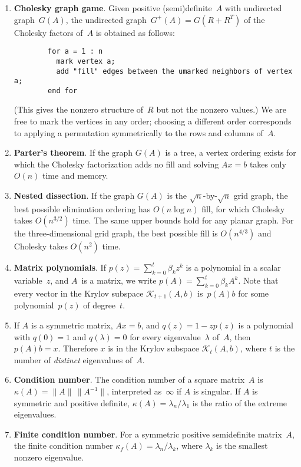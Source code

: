 \documentclass[11pt]{article}
\newcommand{\krylov}{\mathcal{K}}       %
\begin{document}
\begin{enumerate}
\item{\bf Cholesky graph game}.
Given positive (semi)definite~$A$ with undirected graph~$G(A)$,
the undirected graph~$G^+(A)=G(R+R^T)$ of the Cholesky factors
of~$A$ is obtained as follows:
\begin{verbatim}
        for a = 1 : n
          mark vertex a;
          add "fill" edges between the umarked neighbors of vertex a;
        end for
\end{verbatim}
(This gives the nonzero structure of~$R$ but not the nonzero values.)
We are free to mark the vertices in any order;
choosing a different order corresponds to applying a
permutation symmetrically to the rows and columns of~$A$.

\item{\bf Parter's theorem}.
If the graph $G(A)$ is a tree, a vertex ordering exists for
which the Cholesky factorization adds no fill and solving
$Ax=b$ takes only $O(n)$ time and memory.

\item{\bf Nested dissection}.
If the graph $G(A)$ is the $\sqrt{n}$-by-$\sqrt{n}$ grid graph,
the best possible elimination ordering has $O(n\log n)$ fill,
for which Cholesky takes $O(n^{3/2})$ time.
The same upper bounds hold for any planar graph.
For the three-dimensional grid graph, the best possible
fill is $O(n^{4/3})$ and Cholesky takes $O(n^2)$ time.

\item{\bf Matrix polynomials}.
If $p(z) = \sum_{k=0}^t \beta_kz^k$ is a polynomial in a 
scalar variable~$z$, and $A$~is a matrix,
we write $p(A) = \sum_{k=0}^t \beta_kA^k$.
Note that every vector in the Krylov subspace $\krylov_{t+1}(A,b)$
is~$p(A)b$ for some polynomial~$p(z)$ of degree~$t$.

\item
If $A$ is a symmetric matrix, $Ax=b$, 
and $q(z) = 1 - zp(z)$ is a polynomial with
$q(0)=1$ and $q(\lambda)=0$ for every eigenvalue~$\lambda$ of~$A$,
then $p(A)b = x$.
Therefore $x$ is in the Krylov subspace $\krylov_{t}(A,b)$, 
where $t$ is the number of {\em distinct} eigenvalues of~$A$.

\item{\bf Condition number}.
The condition number of a square matrix~$A$ is 
$\kappa(A)=\|A\|\,\|A^{-1}\|$, interpreted as~$\infty$
if $A$ is singular.  If $A$ is symmetric and positive 
definite, $\kappa(A) = \lambda_n/\lambda_1$ is the ratio
of the extreme eigenvalues.

\item{\bf Finite condition number}.
For a symmetric positive semidefinite matrix~$A$,
the finite condition number
$\kappa_f(A)=\lambda_n/\lambda_k$, where $\lambda_k$ is
the smallest nonzero eigenvalue.


\end{enumerate}
\end{document}
